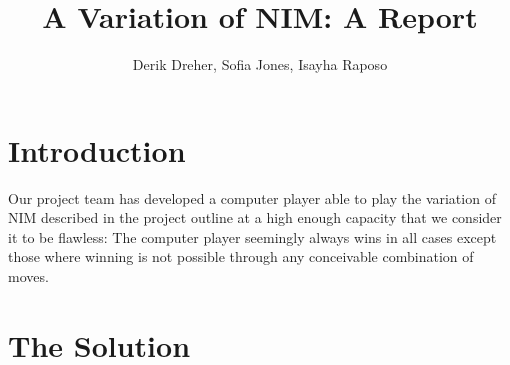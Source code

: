 \documentclass{article}
\begin{document}
\begin{titlepage}
\title{A Variation of NIM: A Report}
\author{Derik Dreher, Sofia Jones, Isayha Raposo}
\maketitle
\thispagestyle{empty}
\end{titlepage}

\rhead{\today}

\section*{Introduction}
Our project team has developed a computer player able to play the variation of NIM described in the project outline at a high enough capacity that we consider it to be flawless: The computer player seemingly always wins in all cases except those where winning is not possible through any conceivable combination of moves.

\section*{The Solution}
\end{document}
